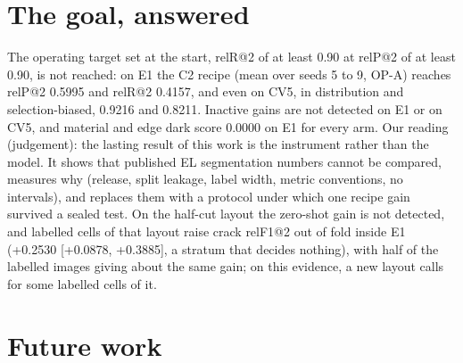 \section{The goal, answered}\label{sec:concl-goal}

The operating target set at the start, relR@2 of at least 0.90 at relP@2 of at least 0.90, is not reached: on E1 the C2 recipe
(mean over seeds 5 to 9, OP-A) reaches relP@2 0.5995 and relR@2 0.4157, and even on CV5, in distribution and selection-biased,
0.9216 and 0.8211. Inactive gains
are not detected on E1 or on CV5, and material and edge dark score 0.0000 on E1 for every arm. Our reading (judgement): the lasting
result of this work is the instrument rather than the model. It shows that published EL segmentation numbers cannot be compared,
measures why (release, split leakage, label width, metric conventions, no intervals), and replaces them with a protocol under which
one recipe gain survived a sealed test. On the half-cut layout the zero-shot gain is not detected, and labelled cells of that
layout raise crack relF1@2 out of fold inside E1 (+0.2530 [+0.0878, +0.3885], a stratum that decides nothing), with half of the
labelled images giving about the same gain; on this evidence, a new layout calls for some labelled cells of it.

\section{Future work}\label{sec:concl-future}

